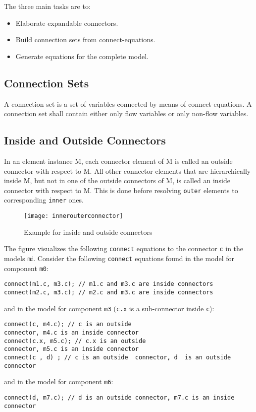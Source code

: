 The three main tasks are to:
\begin{itemize}
\item
  Elaborate expandable connectors.
\item
  Build connection sets from connect-equations.
\item
  Generate equations for the complete model.
\end{itemize}

\subsection{Connection Sets}\label{connection-sets}

A connection set is a set of variables connected by means of
connect-equations. A connection set shall contain either only flow
variables or only non-flow variables.

\subsection{Inside and Outside Connectors}\label{inside-and-outside-connectors}

In an element instance M, each connector element of M is called an
outside connector with respect to M. All other connector elements that
are hierarchically inside M, but not in one of the outside connectors of
M, is called an inside connector with respect to M. This is done before
resolving \lstinline!outer! elements to corresponding \lstinline!inner! ones.

\begin{example}
\begin{figure}[H]
\texttt{[image: innerouterconnector]}
\caption{Example for inside and outside connectors}
\end{figure}
The figure visualizes the following \lstinline!connect! equations to
the connector \lstinline!c! in the models \lstinline!m!$i$. Consider the
following \lstinline!connect! equations found in the model for component \lstinline!m0!:
\begin{lstlisting}[language=modelica]
connect(m1.c, m3.c); // m1.c and m3.c are inside connectors
connect(m2.c, m3.c); // m2.c and m3.c are inside connectors
\end{lstlisting}
and in the model for component \lstinline!m3! (\lstinline!c.x! is a sub-connector inside
\lstinline!c!):
\begin{lstlisting}[language=modelica]
connect(c, m4.c); // c is an outside
connector, m4.c is an inside connector
connect(c.x, m5.c); // c.x is an outside
connector, m5.c is an inside connector
connect(c , d) ; // c is an outside  connector, d  is an outside connector
\end{lstlisting}
and in the model for component \lstinline!m6!:
\begin{lstlisting}[language=modelica]
connect(d, m7.c); // d is an outside connector, m7.c is an inside connector
\end{lstlisting}
\end{example}

